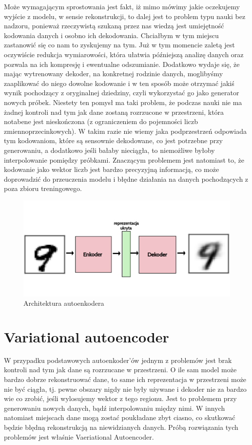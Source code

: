 Może wymagającym sprostowania jest fakt, iż mimo mówimy jakie oczekujemy wyjście z modelu, w sensie rekonstrukcji, to dalej jest to problem typu nauki bez nadzoru, ponieważ rzeczywistą szukaną przez nas wiedzą jest umiejętność kodowania danych i osobno ich dekodowania. Chciałbym w tym miejscu zastanowić się co nam to zyskujemy na tym. Już w tym momencie zaletą jest oczywiście redukcja wymiarowości, która ułatwia późniejszą analizę danych oraz pozwala na ich kompresję i ewentualne odszumianie. Dodatkowo wydaje się, że mając wytrenowany dekoder, na konkretnej rodzinie danych, moglibyśmy zaaplikować do niego dowolne kodowanie i w ten sposób może otrzymać jakiś wynik pochodzący z oryginalnej dziedziny, czyli wykorzystać go jako generator nowych próbek. Niestety ten pomysł ma taki problem, że podczas nauki nie ma żadnej kontroli nad tym jak dane zostaną rozrzucone w przestrzeni, która notabene jest nieskończona (z ograniczeniem do pojemności liczb zmiennoprzecinkowych). W takim razie nie wiemy jaka podprzestrzeń odpowiada tym kodowaniom, które są sensownie dekodowane, co jest potrzebne przy generowaniu, a dodatkowo jeśli bałaby nieciągła, to niemożliwe byłoby interpolowanie pomiędzy próbkami. Znaczącym problemem jest natomiast to, że kodowanie jako wektor liczb jest bardzo precyzyjną informacją, co może doprowadzić do przeuczenia modelu i błędne działania na danych pochodzących z poza zbioru treningowego.

\begin{figure}[h!]
    \centering
    \includegraphics[width=1\textwidth]{images/autoenc}
    \caption{Architektura autoenkodera}
    \label{fig:autoenc}
\end{figure}

\section{Variational autoencoder}

W przypadku podstawowych autoenkoder'ów jednym z problemów jest brak kontroli nad tym jak dane są rozrzucane w przestrzeni. O ile sam model może bardzo dobrze rekonstruować dane, to same ich reprezentacja w przestrzeni może nie być ciągła, tj. pewne obszary nigdy nie były używane i dekoder nie za bardzo wie co zrobić, jeśli wylosujemy wektor z tego regionu. Jest to problemem przy generowaniu nowych danych, bądź interpolowaniu między nimi. W innych natomiast miejscach dane mogą zostać poukładane zbyt ciasno, co skutkować będzie błędną rekonstrukcją na niewidzianych danych. Próbą rozwiązania tych problemów jest właśnie Vaeriational Autoencoder.

